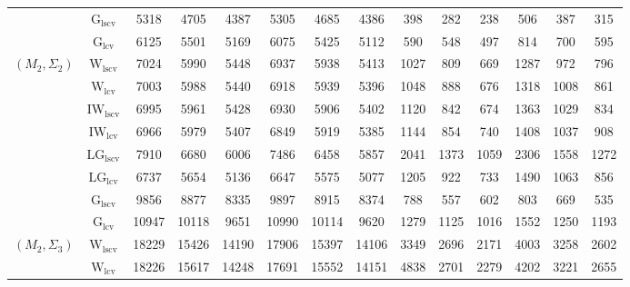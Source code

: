 \begin{table}[!ht]
{\begin{tabular}{@{}cc|ccc|ccc|ccc|ccc@{}}
 & $\mathrm{G}_{\mathrm{lscv}}$ & 5318 & 4705 & 4387 & 5305 & 4685 & 4386 & \cellcolor{black!30}398 & \cellcolor{black!30}282 & \cellcolor{black!30}238 & \cellcolor{black!30}506 & \cellcolor{black!30}387 & \cellcolor{black!30}315 \\ 
 & $\mathrm{G}_{\mathrm{lcv}}$ & 6125 & 5501 & 5169 & 6075 & 5425 & 5112 & \cellcolor{black!10}590 & 548 & 497 & 814 & 700 & 595 \\ 
\midrule
$(M_2,\Sigma_2)$ & $\mathrm{W}_{\mathrm{lscv}}$ & 7024 & 5990 & 5448 & 6937 & 5938 & 5413 & \cellcolor{black!10}1027 & \cellcolor{black!10}809 & \cellcolor{black!10}669 & \cellcolor{black!10}1287 & \cellcolor{black!10}972 & \cellcolor{black!10}796 \\ 
 & $\mathrm{W}_{\mathrm{lcv}}$ & 7003 & 5988 & 5440 & 6918 & 5939 & 5396 & 1048 & 888 & 676 & 1318 & 1008 & 861 \\ 
 & $\mathrm{IW}_{\mathrm{lscv}}$ & 6995 & \cellcolor{black!10}5961 & 5428 & 6930 & \cellcolor{black!10}5906 & 5402 & 1120 & 842 & 674 & 1363 & 1029 & 834 \\ 
 & $\mathrm{IW}_{\mathrm{lcv}}$ & \cellcolor{black!10}6966 & 5979 & \cellcolor{black!10}5407 & \cellcolor{black!10}6849 & 5919 & \cellcolor{black!10}5385 & 1144 & 854 & 740 & 1408 & 1037 & 908 \\ 
 & $\mathrm{LG}_{\mathrm{lscv}}$ & 7910 & 6680 & 6006 & 7486 & 6458 & 5857 & 2041 & 1373 & 1059 & 2306 & 1558 & 1272 \\ 
 & $\mathrm{LG}_{\mathrm{lcv}}$ & \cellcolor{black!30}6737 & \cellcolor{black!30}5654 & \cellcolor{black!30}5136 & \cellcolor{black!30}6647 & \cellcolor{black!30}5575 & \cellcolor{black!30}5077 & 1205 & 922 & 733 & 1490 & 1063 & 856 \\ 
 & $\mathrm{G}_{\mathrm{lscv}}$ & 9856 & 8877 & 8335 & 9897 & 8915 & 8374 & \cellcolor{black!30}788 & \cellcolor{black!30}557 & \cellcolor{black!30}602 & \cellcolor{black!30}803 & \cellcolor{black!30}669 & \cellcolor{black!30}535 \\ 
 & $\mathrm{G}_{\mathrm{lcv}}$ & 10947 & 10118 & 9651 & 10990 & 10114 & 9620 & 1279 & 1125 & 1016 & 1552 & 1250 & 1193 \\ 
\midrule
$(M_2,\Sigma_3)$ & $\mathrm{W}_{\mathrm{lscv}}$ & 18229 & 15426 & 14190 & 17906 & 15397 & 14106 & \cellcolor{black!30}3349 & \cellcolor{black!30}2696 & \cellcolor{black!30}2171 & \cellcolor{black!30}4003 & 3258 & 2602 \\ 
 & $\mathrm{W}_{\mathrm{lcv}}$ & 18226 & 15617 & 14248 & 17691 & 15552 & 14151 & 4838 & \cellcolor{black!10}2701 & \cellcolor{black!10}2279 & \cellcolor{black!10}4202 & 3221 & 2655 \\ 

\end{tabular}}
\end{table}
